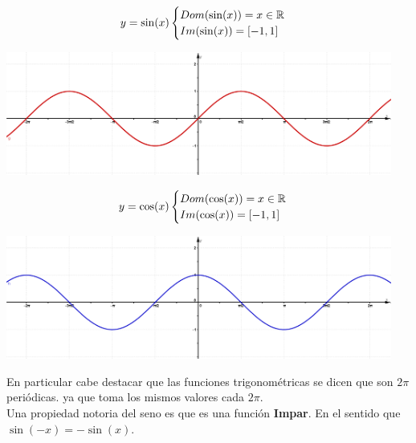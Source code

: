 \documentclass[a4paper,11pt,spanish,sans]{exam}
\begin{document}
\begin{minipage}{0.3\linewidth}
	\[ y=\sin (x)\\
	
	\begin{cases}
		Dom(\sin (x))= x \in \mathbb{R} \\ 
		Im(\sin (x))= [-1,1]\\
	\end{cases} \]

\end{minipage}
\begin{minipage}{0.7\linewidth}
	\includegraphics[width=0.95\textwidth]{sin.png}
\end{minipage}

\begin{minipage}{0.3\linewidth}
	\[ y=\cos (x)\\
	
	\begin{cases}
		Dom(\cos (x))= x \in \mathbb{R} \\ 
		Im(\cos (x))= [-1,1]\\
	\end{cases} \] 
\end{minipage}
\begin{minipage}{0.7\linewidth}
	\includegraphics[width=0.95\textwidth]{cos.png}
\end{minipage}

En particular cabe destacar que las funciones trigonométricas se dicen que son $2\pi$ periódicas. ya que toma los mismos valores cada $2\pi$.\\

Una propiedad notoria del seno es que es una función \textbf{Impar}. En el sentido que $\sin(-x)=-\sin(x)$.
\end{document}
